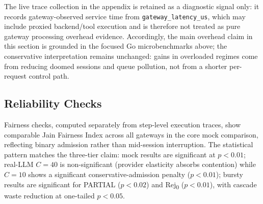 \documentclass[sigconf,review,anonymous]{acmart}
\begin{document}
\begin{table}[t]
\centering
\caption{Gateway processing overhead on this workstation (focused Go microbenchmarks; mean per operation). The purpose is to bound governance cost, not to claim the request path is faster than a no-governance baseline.}
\label{tab:gateway_overhead}
\small
{}
\end{table}

The live trace collection in the appendix is retained as a diagnostic signal only: it records gateway-observed service time from \texttt{gateway\_latency\_us}, which may include proxied backend/tool execution and is therefore not treated as pure gateway processing overhead evidence. Accordingly, the main overhead claim in this section is grounded in the focused Go microbenchmarks above; the conservative interpretation remains unchanged: gains in overloaded regimes come from reducing doomed sessions and queue pollution, not from a shorter per-request control path.

\subsection{Reliability Checks}
\label{sec:fairness}
\label{sec:stats}

Fairness checks, computed separately from step-level execution traces, show comparable Jain Fairness Index across all gateways in the core mock comparison, reflecting binary admission rather than mid-session interruption. The statistical pattern matches the three-tier claim: mock results are significant at $p{<}0.01$; real-LLM $C{=}40$ is non-significant (provider elasticity absorbs contention) while $C{=}10$ shows a significant conservative-admission penalty ($p{<}0.01$); bursty results are significant for PARTIAL ($p{<}0.02$) and Rej\textsubscript{0} ($p{<}0.01$), with cascade waste reduction at one-tailed $p{<}0.05$.
\end{document}

